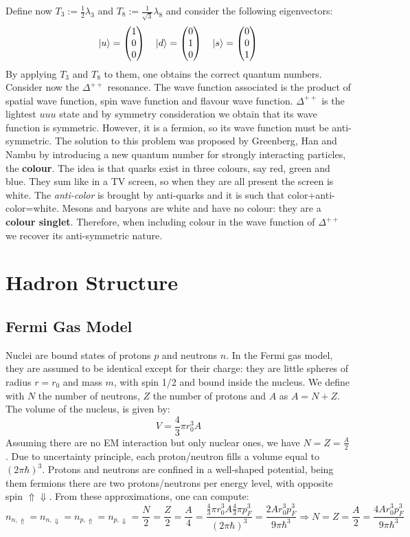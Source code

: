 \documentclass[10.75pt,a4paper,openright,bottom=2cm]{article}
\begin{document}
Define now $T_3:=\frac{1}{2}\lambda_3$ and $T_8:=\frac{1}{\sqrt{3}}\lambda_8$ and consider the following eigenvectors:
\[
\ket{u}=\begin{pmatrix}
    1 \\ 0 \\ 0
\end{pmatrix} \quad \ket{d}=\begin{pmatrix}
    0 \\ 1 \\ 0
\end{pmatrix} \quad \ket{s}=\begin{pmatrix}
    0 \\ 0 \\ 1
\end{pmatrix}
\]
By applying $T_3$ and $T_8$ to them, one obtains the correct quantum numbers.\\
Consider now the $\Delta^{++}$ resonance. The wave function associated is the product of spatial wave function, spin wave function and flavour wave function. $\Delta^{++}$ is the lightest $uuu$ state and by symmetry consideration we obtain that its wave function is symmetric. However, it is a fermion, so its wave function must be anti-symmetric. The solution to this problem was proposed by Greenberg, Han and Nambu by introducing a new quantum number for strongly interacting particles, the \textbf{colour}. The idea is that quarks exist in three colours, say red, green and blue. They sum like in a TV screen, so when they are all present the screen is white. The \textit{anti-color} is brought by anti-quarks and it is such that color+anti-color=white. Mesons and baryons are white and have no colour: they are a \textbf{colour singlet}. Therefore, when including colour in the wave function of $\Delta^{++}$ we recover its anti-symmetric nature. 
\section{Hadron Structure}
\subsection{Fermi Gas Model}
Nuclei are bound states of protons $p$ and neutrons $n$. In the Fermi gas model, they are assumed to be identical except for their charge: they are little spheres of radius $r=r_0$ and mass $m$, with spin 1/2 and bound inside the nucleus. We define with $N$ the number of neutrons, $Z$ the number of protons and $A$ as $A=N+Z$. The volume of the nucleus, is given by:
\[
V=\frac{4}{3}\pi r_0^3A
\]
Assuming there are no EM interaction but only nuclear ones, we have $N=Z=\frac{A}{2}$. Due to uncertainty principle, each proton/neutron fills a volume equal to $(2\pi\hbar)^3$. Protons and neutrons are confined in a well-shaped potential, being them fermions there are two protons/neutrons per energy level, with opposite spin $\Uparrow\Downarrow$. From these approximations, one can compute:
\[
n_{n,\Uparrow}=n_{n,\Downarrow}=n_{p,\Uparrow}=n_{p,\Downarrow}=\frac{N}{2}=\frac{Z}{2}=\frac{A}{4}=\frac{\frac{4}{3}\pi r_0^3A\frac{4}{3}\pi p_F^3}{(2\pi\hbar)^3}=\frac{2Ar_0^3p_F^3}{9\pi\hbar^3}\Rightarrow N=Z=\frac{A}{2}=\frac{4Ar_0^3p_F^3}{9\pi\hbar^3}
\]
\end{document}
